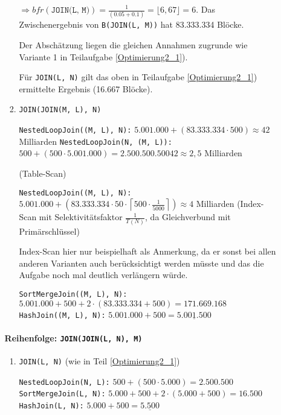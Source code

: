 \begin{enumerate}[a)]
\begin{enumerate}[i)]
\begin{solution}
\begin{enumerate}[1.]
			  $\Rightarrow bfr(\texttt{JOIN(L, M)}) = \frac{1}{(0.05 + 0.1)} = \lfloor6,67\rfloor = 6$.
			  Das Zwischenergebnis von \texttt{B(JOIN(L, M))} hat 83.333.334 Blöcke.

			  Der Abschätzung liegen die gleichen Annahmen zugrunde wie Variante 1 in Teilaufgabe \ref{Optimierung2_1}).

			  Für \texttt{JOIN(L, N)} gilt das oben in Teilaufgabe \ref{Optimierung2_1}) ermittelte Ergebnis (16.667 Blöcke).

			\item \texttt{JOIN(JOIN(M, L), N)}

			  \texttt{NestedLoopJoin((M, L), N):} $5.001.000 + (83.333.334 \cdot 500) \approx 42$ Milliarden
			  \texttt{NestedLoopJoin(N, (M, L)):} $500 + (500 \cdot 5.001.000) = 2.500.500.500 42 \approx 2,5$ Milliarden

			\begin{note}
			(Table-Scan)

			\texttt{NestedLoopJoin((M, L), N):} $5.001.000 + (83.333.334 \cdot 50 \cdot \left \lceil{ 500 \cdot \frac{1}{5000} }\right \rceil ) \approx 4$ Milliarden (Index-Scan mit Selektivitätsfaktor $\frac{1}{T(N)}$, da Gleichverbund mit Primärschlüssel)

			Index-Scan hier nur beispielhaft als Anmerkung, da er sonst bei allen anderen Varianten auch berücksichtigt werden müsste und das die Aufgabe noch mal deutlich verlängern würde.
			\end{note}

			  \texttt{SortMergeJoin((M, L), N):} $5.001.000 + 500 + 2 \cdot (83.333.334 + 500) = 171.669.168$ \\
			  \texttt{HashJoin((M, L), N):} $5.001.000 + 500 = \underline{5.001.500}$

		\end{enumerate}

		\paragraph{\color{solutioncolor}Reihenfolge: \texttt{JOIN(JOIN(L, N), M)}}

		\begin{enumerate}[1.]

			\item \texttt{JOIN(L, N)} (wie in Teil \ref{Optimierung2_1})

			  \texttt{NestedLoopJoin(N, L):} $500 + (500 \cdot 5.000) = 2.500.500$ \\
			  \texttt{SortMergeJoin(L, N):} $5.000 +500 + 2 \cdot (5.000 + 500) = 16.500$ \\
			  \texttt{HashJoin(L, N):} $5.000 + 500 = \underline{5.500}$ \\


\end{enumerate}
\end{solution}
\end{enumerate}
\end{enumerate}
